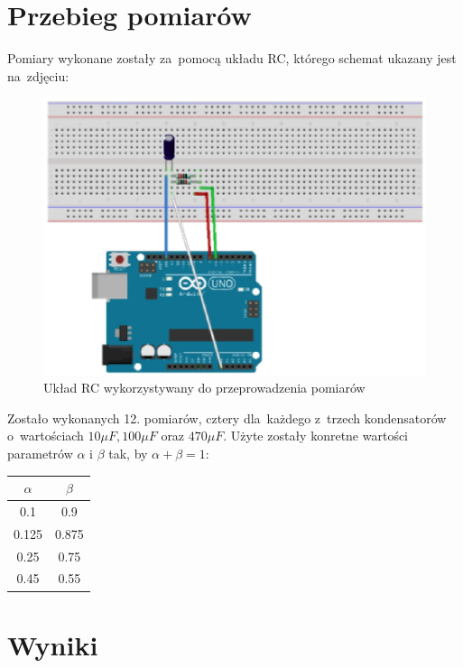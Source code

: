 \documentclass[12pt]{mwart}
\begin{document}
	\section{Przebieg pomiarów}
	Pomiary wykonane zostały za~pomocą układu RC, którego schemat ukazany jest na~zdjęciu:
	\begin{figure}[H]
		\centering
		\includegraphics[scale = 0.35]{schemat.jpg}
		\caption{Układ RC wykorzystywany do przeprowadzenia pomiarów}
	\end{figure}
	Zostało wykonanych 12. pomiarów, cztery dla~każdego z~trzech kondensatorów o~wartościach $10\mu F, 100\mu F$ oraz $470\mu F$. Użyte zostały konretne wartości parametrów $\alpha$ i $\beta$ tak, by $\alpha+\beta=1$:
	\begin{table}[h] %
		\centering
		\begin{tabular}{cc}
			\hline
			$\alpha$ & $\beta$ \\ \hline
			0.1 & 0.9  \\ \hline
			0.125 & 0.875  \\ \hline
			0.25 & 0.75 \\ \hline
			0.45 & 0.55  \\ \hline
		\end{tabular}
	\end{table}
	\section{Wyniki}
\end{document}
